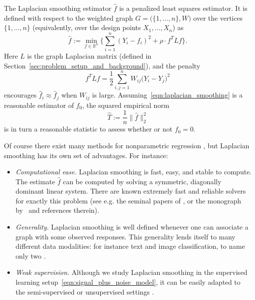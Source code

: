 \documentclass[twoside]{article}
\newcommand{\Reals}{\mathbb{R}}
\newcommand{\1}{\mathbf{1}}
\newcommand{\Lap}{L}
\newcommand{\wh}[1]{\widehat{#1}}
\theoremstyle{definition}
\theoremstyle{remark}
\begin{document}
The Laplacian smoothing estimator $\wh{f}$ \citep{smola2003} is a penalized least squares estimator. It is defined with respect to the weighted graph $G = \bigl(\{1,\ldots,n\},W\bigr)$ over the vertices $\{1,\ldots,n\}$ (equivalently, over the design points $X_1,\ldots,X_n$) as
\begin{equation}
\label{eqn:laplacian_smoothing}
\wh{f} :=  \min_{f \in \Reals^n} \biggl\{\sum_{i = 1}^{n}(Y_i - f_i)^2 + \rho \cdot f^T \Lap f \biggr\}.
\end{equation}
Here $\Lap$ is the graph Laplacian matrix (defined in Section~\ref{sec:problem_setup_and_background}), and the penalty
\begin{equation*}
f^T \Lap f = \frac{1}{2} \sum_{i,j = 1}^{n} W_{ij}\bigl(Y_i - Y_j\bigr)^2
\end{equation*}
encourages $\wh{f}_i \approx \wh{f}_j$ when $W_{ij}$ is large. Assuming~\eqref{eqn:laplacian_smoothing} is a reasonable estimator of $f_0$, the squared empirical norm
\begin{equation}
\label{eqn:laplacian_smoothing_test}
\wh{T} := \frac{1}{n}\bigl\|\wh{f}\bigr\|_2^2 
\end{equation}
is in turn a reasonable statistic to assess whether or not $f_0 = 0$. 

Of course there exist many methods for nonparametric regression \citep{gyorfi2006,wasserman2006,tsybakov2008_book}, but Laplacian smoothing has its own set of advantages. For instance:
\begin{itemize}
	\item \emph{Computational ease.} Laplacian smoothing is fast, easy, and stable to compute. The estimate $\wh{f}$ can be computed by solving a symmetric, diagonally dominant linear system. There are known extremely fast and reliable solvers for exactly this problem (see e.g. the seminal papers of \cite{spielman2011,spielman2013,spielman2014}, or the monograph by~\cite{vishnoi2012} and references therein).
	\item \emph{Generality.} Laplacian smoothing is well defined whenever one can associate a graph with some observed responses. This generality lends itself to many different data modalities: for instance text and image classification, to name only two \citep{kondor2002, belkin03a,belkin2006}. 
	\item \emph{Weak supervision.} Although we study Laplacian smoothing in the supervised learning setup~\eqref{eqn:signal_plus_noise_model}, it can be easily adapted to the semi-supervised or unsupervised settings \citep{nadler09,slepcev17,dunlop2020,calder2019b}.
\end{itemize}
\end{document}

